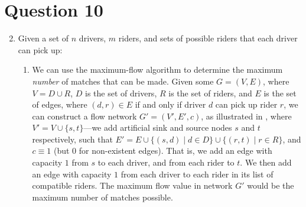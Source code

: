 \documentclass{article}
\begin{document}
\FloatBarrier

\section{Question 10}

\begin{enumerate}[label=(\alph*)]
    \setcounter{enumi}{1}

    \item Given a set of $n$ drivers, $m$ riders, and sets of possible riders that each driver can pick up:
    
    \begin{enumerate}[label=(\roman*)]
        \item We can use the maximum-flow algorithm to determine the maximum \textit{number} of matches that can be made. Given some $G = (V, E)$, where $V = D \cup R$, $D$ is the set of drivers, $R$ is the set of riders, and $E$ is the set of edges, where $(d, r) \in E$ if and only if driver $d$ can pick up rider $r$, we can construct a flow network $G' = (V', E', c)$, as illustrated in , where $V' = V \cup \{s, t\}$---we add artificial sink and source nodes $s$ and $t$ respectively, such that $E' = E \cup \{(s, d) \mid d \in D\} \cup \{(r, t) \mid r \in R\}$, and $c \equiv 1$ (but 0 for non-existent edges). That is, we add an edge with capacity $1$ from $s$ to each driver, and from each rider to $t$. We then add an edge with capacity $1$ from each driver to each rider in its list of compatible riders. The maximum flow value in network $G'$ would be the maximum number of matches possible.
        
        \begin{figure*}[h]
            \centering
\end{figure*}
\end{enumerate}
\end{enumerate}
\end{document}
